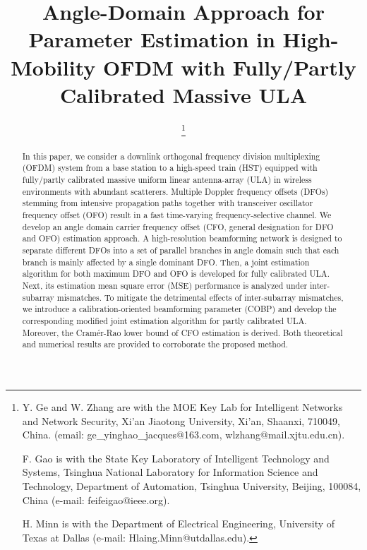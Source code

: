 \documentclass[12pt, draftclsnofoot, onecolumn]{IEEEtran}
\begin{document}
\title{\Large Angle-Domain Approach for Parameter Estimation in High-Mobility OFDM with Fully/Partly Calibrated Massive ULA
 }

\author{
\thanks{Y. Ge and W. Zhang are with the MOE Key Lab for Intelligent Networks and Network Security, Xi'an Jiaotong University, Xi'an, Shaanxi, 710049, China. (email: ge\_yinghao\_jacques@163.com, wlzhang@mail.xjtu.edu.cn).

F. Gao is with the State Key Laboratory of Intelligent Technology and Systems, Tsinghua National Laboratory for Information Science and Technology, Department of Automation, Tsinghua University, Beijing, 100084, China (e-mail: feifeigao@ieee.org).

H. Minn is with the Department of Electrical Engineering, University of Texas at Dallas (e-mail: Hlaing.Minn@utdallas.edu).}
}

 \maketitle

\vspace{-2em}

\begin{abstract}
In this paper, we consider a downlink orthogonal frequency division multiplexing (OFDM) system from a base station to a high-speed train (HST) equipped with fully/partly calibrated massive uniform linear antenna-array (ULA) in wireless environments with abundant scatterers. Multiple Doppler frequency offsets (DFOs) stemming from intensive propagation paths together with transceiver oscillator frequency offset (OFO) result in a fast time-varying frequency-selective channel. We develop an angle domain carrier frequency offset (CFO, general designation for DFO and OFO) estimation approach. A high-resolution beamforming network is designed to separate different DFOs into a set of parallel branches in angle domain such that each branch is mainly affected by a single dominant DFO. Then, a joint estimation algorithm for both maximum DFO and OFO is developed for fully calibrated ULA. Next, its estimation mean square error (MSE) performance is analyzed under inter-subarray mismatches. To  mitigate the detrimental effects of inter-subarray mismatches, we introduce a calibration-oriented beamforming parameter (COBP) and develop the corresponding modified joint estimation algorithm for partly calibrated ULA. Moreover, the Cram\'{e}r-Rao lower bound of CFO estimation is derived. Both theoretical and numerical results are provided to corroborate the proposed method.
\end{abstract}
\end{document}

